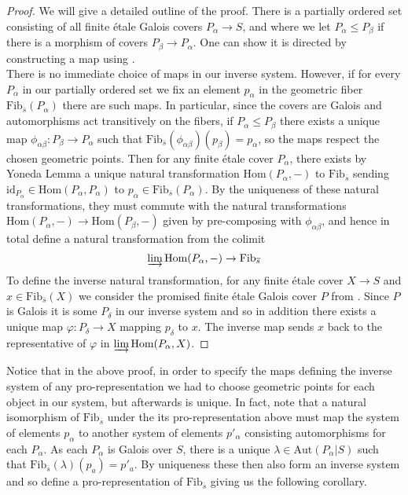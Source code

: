 \documentclass{article}
\theoremstyle{definition}
\theoremstyle{remark}
\theoremstyle{plain}
\begin{document}
\begin{proof}
	We will give a detailed outline of the proof.
	There is a partially ordered set consisting of all finite \'etale Galois covers $P_{\alpha} \to S$, and where we let $P_{\alpha} \leq P_{\beta}$ if there is a morphism of covers $P_{\beta} \to P_{\alpha}$.
	One can show it is directed by constructing a map using .\\
	\indent There is no immediate choice of maps in our inverse system.
	However, if for every $P_{\alpha}$ in our partially ordered set we fix an element $p_{\alpha}$ in the geometric fiber $\text{Fib}_{\overline{s}}(P_{\alpha})$ there are such maps.
	In particular, since the covers are Galois and automorphisms act transitively on the fibers, if $P_{\alpha} \leq P_{\beta}$ there exists a unique map $\phi_{\alpha \beta}: P_{\beta} \to P_{\alpha}$ such that $\text{Fib}_{\overline{s}}(\phi_{\alpha \beta})(p_{\beta}) = p_{\alpha}$, so the maps respect the chosen geometric points.
	Then for any finite \'etale cover $P_{\alpha}$, there exists by Yoneda Lemma a unique natural transformation $\text{Hom}(P_{\alpha}, -)$ to $\text{Fib}_{\overline{s}}$ sending $\text{id}_{P_{\alpha}} \in \text{Hom}(P_{\alpha}, P_{\alpha})$ to $p_{\alpha} \in \text{Fib}_{\overline{s}}(P_{\alpha})$.
	By the uniqueness of these natural transformations, they must commute with the natural transformations $\text{Hom}(P_{\alpha}, -) \to \text{Hom}(P_{\beta}, -)$ given by pre-composing with $\phi_{\alpha \beta}$, and hence in total define a natural transformation from the colimit
	\[\varinjlim \text{Hom}(P_{\alpha}, -) \to \text{Fib}_{\overline{s}}\]
	To define the inverse natural transformation, for any finite \'etale cover $X \to S$ and $x \in \text{Fib}_{\overline{s}}(X)$ we consider the promised finite \'etale Galois cover $P$ from .
	Since $P$ is Galois it is some $P_{\delta}$ in our inverse system and so in addition there exists a unique map $\varphi: P_{\delta} \to X$ mapping $p_{\delta}$ to $x$.
The inverse map sends $x$ back to the representative of $\varphi$ in $\varinjlim \text{Hom}(P_{\alpha}, X)$.

\end{proof}

Notice that in the above proof, in order to specify the maps defining the inverse system of any pro-representation we had to choose geometric points for each object in our system, but afterwards is unique.
In fact, note that a natural isomorphism of $\text{Fib}_{\overline{s}}$ under the its pro-representation above must map the system of elements $p_{\alpha}$ to another system of elements $p'_{\alpha}$ consisting automorphisms for each $P_{\alpha}$.
As each $P_{\alpha}$ is Galois over $S$, there is a unique $ \lambda \in \text{Aut}(P_{\alpha}|S)$ such that $\text{Fib}_{\overline{s}}(\lambda)(p_a) = p'_a$.
By uniqueness these then also form an inverse system and so define a pro-representation of $\text{Fib}_{\overline{s}}$ giving us the following corollary.
\end{document}
